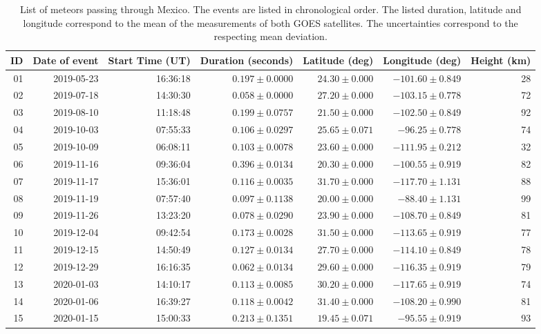 \begin{table}
  \centering
  \caption{List of meteors passing through Mexico. The events are listed in chronological order. The listed duration, latitude and longitude correspond to the mean of the measurements of both GOES satellites. The uncertainties correspond to the respecting mean deviation.}
\label{tab:table-meteors}
\begin{tabular}{rrrrrrr}
\hline
ID & Date of event & Start Time (UT)  & Duration (seconds) & Latitude (deg) & Longitude (deg) & Height (km)\\
\hline
01 & 2019-05-23 & 16:36:18 & $0.197\pm 0.0000$ & $24.30 \pm 0.000$ & $-101.60 \pm 0.849$  & 28\\
02 & 2019-07-18 & 14:30:30 & $0.058\pm 0.0000$ & $27.20 \pm 0.000$ & $-103.15 \pm 0.778$  & 72\\
03 & 2019-08-10 & 11:18:48 & $0.199\pm 0.0757$ & $21.50 \pm 0.000$ & $-102.50  \pm 0.849$ & 92\\
04 & 2019-10-03 & 07:55:33 & $0.106\pm 0.0297$ & $25.65 \pm 0.071$ & $-96.25 \pm   0.778$ & 74\\
05 & 2019-10-09 & 06:08:11 & $0.103\pm 0.0078$ & $23.60 \pm 0.000$ & $-111.95 \pm  0.212$ & 32\\
06 & 2019-11-16 & 09:36:04 & $0.396\pm 0.0134$ & $20.30 \pm 0.000$ & $-100.55 \pm  0.919$ & 82\\
07 & 2019-11-17 & 15:36:01 & $0.116\pm 0.0035$ & $31.70 \pm 0.000$ & $-117.70 \pm  1.131$ & 88\\
08 & 2019-11-19 & 07:57:40 & $0.097\pm 0.1138$ & $20.00 \pm 0.000$ & $-88.40 \pm  1.131$  & 99\\
09 & 2019-11-26 & 13:23:20 & $0.078\pm 0.0290$ & $23.90 \pm 0.000$ & $-108.70 \pm  0.849$ & 81\\
10 & 2019-12-04 & 09:42:54 & $0.173\pm 0.0028$ & $31.50 \pm 0.000$ & $-113.65 \pm  0.919$ & 77\\
11 & 2019-12-15 & 14:50:49 & $0.127\pm 0.0134$ & $27.70 \pm 0.000$ & $-114.10 \pm  0.849$ & 78\\
12 & 2019-12-29 & 16:16:35 & $0.062\pm 0.0134$ & $29.60 \pm 0.000$ & $-116.35 \pm  0.919$ & 79\\
13 & 2020-01-03 & 14:10:17 & $0.113\pm 0.0085$ & $30.20 \pm 0.000$ & $-117.65 \pm  0.919$ & 74\\
14 & 2020-01-06 & 16:39:27 & $0.118\pm 0.0042$ & $31.40 \pm 0.000$ & $-108.20 \pm  0.990$ & 81\\
15 & 2020-01-15 & 15:00:33 & $0.213\pm 0.1351$ & $19.45 \pm 0.071$ & $-95.55 \pm   0.919$ & 93\\

\end{tabular}
\end{table}
